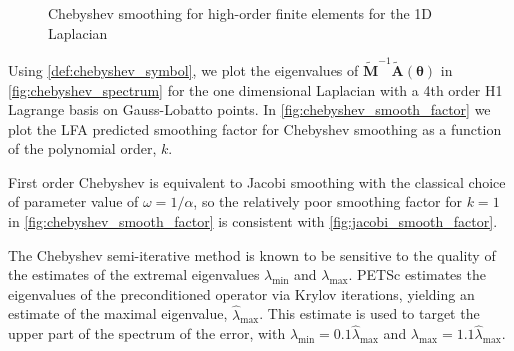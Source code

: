 \documentclass[review]{siamart190516}
\begin{document}
\begin{figure}[!tbp]
  \centering
  \hfill
  \caption{Chebyshev smoothing for high-order finite elements for the 1D Laplacian}
\end{figure}

Using \cref{def:chebyshev_symbol}, we plot the eigenvalues of $\tilde{\mathbf{M}}^{-1} \tilde{\mathbf{A}} \left( \boldsymbol{\theta} \right)$ in \cref{fig:chebyshev_spectrum} for the one dimensional Laplacian with a 4th order H1 Lagrange basis on Gauss-Lobatto points.
In \cref{fig:chebyshev_smooth_factor} we plot the LFA predicted smoothing factor for Chebyshev smoothing as a function of the polynomial order, $k$.

First order Chebyshev is equivalent to Jacobi smoothing with the classical choice of parameter value of $\omega = 1 / \alpha$, so the relatively poor smoothing factor for $k = 1$ in \cref{fig:chebyshev_smooth_factor} is consistent with \cref{fig:jacobi_smooth_factor}.

The Chebyshev semi-iterative method is known to be sensitive to the quality of the estimates of the extremal eigenvalues $\lambda_{\text{min}}$ and $\lambda_{\text{max}}$.
PETSc \cite{petsc-user-ref} estimates the eigenvalues of the preconditioned operator via Krylov iterations, yielding an estimate of the maximal eigenvalue, $\hat{\lambda}_{\text{max}}$.
This estimate is used to target the upper part of the spectrum of the error, with $\lambda_{\text{min}} = 0.1 \hat{\lambda}_{\text{max}}$ and $\lambda_{\text{max}} = 1.1 \hat{\lambda}_{\text{max}}$.
\end{document}
